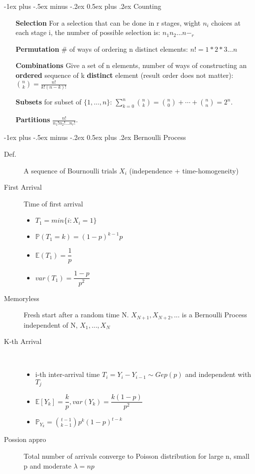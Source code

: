 \documentclass[a4paper, 10pt,landscape]{article}
\makeatletter
\renewcommand{\section}{\@startsection{section}{1}{0mm}%
                                {-1ex plus -.5ex minus -.2ex}%
                                {0.5ex plus .2ex}%
                                {\normalfont\large\bfseries}}
\makeatother
\begin{document}
\begin{multicols*}{4}
\section{Counting}
\begin{enumerate}
\item[\bf Selection] For a selection that can be done in r stages, wight $n_i$ choices at each stage i, the number of possible selection is: $n_1n_2...n-_r$
\item[\bf Permutation] \# of ways of ordering n distinct elements: $n!=1*2*3...n$
\item[\bf Combinations] Give a set of n elements, number of ways of constructing an {\bf ordered} sequence of k {\bf distinct} element (result order does not matter): $\binom{n}{k}=\frac{n!}{k!(n-k)!}$
\item[\bf Subsets] for subset of $\{1,...,n\}$: $\sum_{k=0}^{n}\binom{n}{k}=\binom{n}{0}+\cdots+\binom{n}{n}=2^n.$
\item[\bf Partitions] $\frac{n!}{n_1!n_2!\dots n_r!}.$
\end{enumerate}

\section{Bernoulli Process}
\begin{description}
	\item[Def.] A sequence of Bournoulli trials $X_i$ (independence + time-homogeneity)
	\item[First Arrival] Time of first arrival
		\begin{itemize}
			\item $T_1 = min\{i: X_i=1\}$
			\item $\mathbb{P}(T_1=k) = (1-p)^{k-1}p$
			\item $\mathbb{E}(T_1) = \dfrac{1}{p}$
			\item $var(T_1) = \dfrac{1-p}{p^2}$
		\end{itemize}
	\item[Memoryless] Fresh start after a random time N. $X_{N+1}, X_{N+2}, ...$ is a Bernoulli Process independent of N, $X_1, ... ,X_N$
	\item[K-th Arrival]~
		\begin{itemize}
			\item i-th inter-arrival time $T_i =Y_i - Y_{i-1} \sim Gep(p)$ and independent with $T_j$
			\item $\mathbb{E}[Y_k]=\dfrac{k}{p}, var(Y_k)=\dfrac{k(1-p)}{p^2}$
			\item $\mathbb{P}_{Y_k}= \binom{t-1}{k-1}p^k(1-p)^{t-k}$
		\end{itemize}
	\item[Possion appro] Total number of arrivals converge to Poisson distribution for large n, small p and moderate $\lambda=np$
\end{description}


\end{multicols*}
\end{document}
